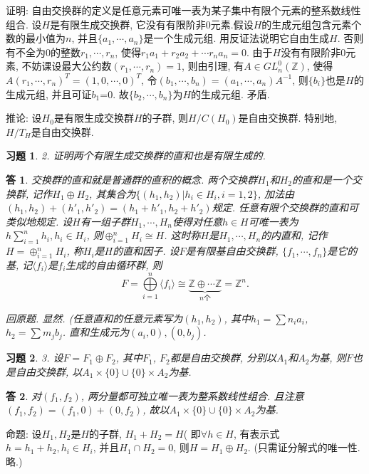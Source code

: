 \documentclass{ctexart}%
\newtheorem*{exercise}{习题}
\newtheorem*{solution}{答}
\theoremstyle{definition}
\theoremstyle{remark}
\begin{document}
证明: 自由交换群的定义是任意元素可唯一表为某子集中有限个元素的整系数线性组合. 设$H$是有限生成交换群, 它没有有限阶非0元素.假设$H$的生成元组包含元素个数的最小值为$n$, 并且$\{a_1,\cdots, a_n\}$是一个生成元组. 用反证法说明它自由生成$H$. 否则有不全为0的整数$r_1,\cdots,r_n$, 使得$r_1a_1+r_2a_2+\cdots r_na_n=0$. 由于$H$没有有限阶非0元素, 不妨课设最大公约数$(r_1,\cdots,r_n)=1$, 则由引理, 有$A\in GL^0_n(\mathbb{Z})$, 使得$A(r_1,\cdots,r_n)^T=(1,0,\cdots,0)^T$, 令$(b_1,\cdots,b_n)=(a_1,\cdots,a_n)A^{-1}$, 则$\{b_i\}$也是$H$的生成元组, 并且可证$b_1$=0. 故$\{b_2,\cdots,b_n\}$为$H$的生成元组. 矛盾. 

推论: 设$H_0$是有限生成交换群$H$的子群, 则$H/C(H_0)$是自由交换群. 特别地, $H/T_H$是自由交换群. 

\begin{exercise}2. 证明两个有限生成交换群的直和也是有限生成的.
\end{exercise}
\begin{solution}
交换群的直和就是普通群的直积的概念. 两个交换群$H_1$和$H_2$的直和是一个交换群, 记作$H_1\oplus H_2$, 其集合为$\{(h_1,h_2)|h_i\in H_i, i=1,2\}$, 加法由$(h_1,h_2)+(h'_1,h'_2)=(h_1+h'_1,h_2+h'_2)$规定. 任意有限个交换群的直和可类似地规定. 设$H$有一组子群$H_1,\cdots, H_n$使得对任意$h\in H$可唯一表为$h\sum_{i=1}^n h_i,h_i\in H_i$, 则$\oplus_{i=1}^nH_i\cong H$. 这时称$H$是$H_1,\cdots,H_n$的内直和, 记作$H=\oplus_{i=1}^nH_i$, 称$H_i$是$H$的直和因子. 设$F$是有限基自由交换群, $\{f_1,\cdots,f_n\}$是它的基, 记$\langle f_i\rangle$是$f_i$生成的自由循环群, 则
$$F= \bigoplus\limits_{i=1}^n\langle f_i\rangle \cong \underbrace{\mathbb{Z}\oplus\cdots\mathbb{Z}}_{n\text{个}} = \mathbb{Z}^n.$$

回原题. 显然. (任意直和的任意元素写为$(h_1,h_2)$, 其中$h_1= \sum n_i a_i$, $h_2=\sum m_j b_j$. 直和生成元为$(a_i,0),(0,b_j)$. 
\end{solution}

\begin{exercise}3. 设$F=F_1\oplus F_2$, 其中$F_1$, $F_2$都是自由交换群, 分别以$A_1$和$A_2$为基, 则$F$也是自由交换群, 以$A_1\times \{0\}\cup \{0\}\times A_2$为基. 
\end{exercise}
\begin{solution}
对$(f_1,f_2)$, 两分量都可独立唯一表为整系数线性组合. 且注意$(f_1,f_2)=(f_1,0)+(0,f_2)$, 故以$A_1\times \{0\}\cup \{0\}\times A_2$为基.
\end{solution}

命题: 设$H_1,H_2$是$H$的子群, $H_1+H_2=H$( 即$\forall h\in H$, 有表示式$h=h_1+h_2,h_i\in H_i$, 并且$H_1\cap H_2=0$, 则$H = H_1 \oplus H_2$. (只需证分解式的唯一性. 略.)
\end{document}

